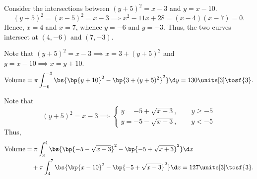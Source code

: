 \begin{solution}
    \begin{ppart}
        Consider the intersections between $(y+5)^2 = x-3$ and $y = x-10$. \[(y+5)^2 = (x-5)^2 = x-3 \implies  x^2 - 11x + 28 = (x-4)(x-7) = 0.\] Hence, $x = 4$ and $x = 7$, whence $y = -6$ and $y = -3$. Thus, the two curves intersect at $(4, -6)$ and $(7, -3)$.

        Note that $(y+5)^2 = x - 3 \implies x = 3 + (y+5)^2$ and $y = x - 10 \implies x = y + 10$. \[\volume = \pi \int_{-6}^{-3} \bs{\bp{y+10}^2 - \bp{3 + (y+5)^2}^2} \d y = 130 \units[3] \tosf{3}.\]
    \end{ppart}
    \begin{ppart}
        Note that
        \[(y+5)^2 = x - 3 \implies \begin{cases}
                y = -5+\sqrt{x-3},\qquad y \geq -5\\
                y = -5-\sqrt{x-3}, \qquad y < -5
        \end{cases}\] Thus,
        \begin{align*}
            \volume &= \pi\int_3^4 \bs{\bp{-5-\sqrt{x-3}}^2 - \bp{-5+\sqrt{x+3}}^2} \d x\\
            &\quad + \pi\int_4^7 \bs{\bp{x-10}^2 - \bp{-5+\sqrt{x-3}}^2} \d x = 127 \units[3] \tosf{3}.
        \end{align*}
    \end{ppart}
\end{solution}

